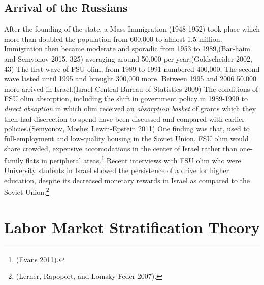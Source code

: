 \documentclass[12pt,twoside]{reedthesis}
\begin{document}
  \section{Arrival of the Russians}\label{sec:orgheadline2}
  
  After the founding of the state, a Mass Immigration (1948-1952) took
  place which more than doubled the population from 600,000 to almost 1.5
  million. Immigration then became moderate and sporadic from 1953 to
  1989,(Bar-haim and Semyonov 2015, 325) averaging around 50,000 per
  year.(Goldscheider 2002, 43) The first wave of FSU olim, from 1989 to
  1991 numbered 400,000. The second wave lasted until 1995 and brought
  300,000 more. Between 1995 and 2006 50,000 more arrived in
  Israel.(Israel Central Bureau of Statistics 2009) The conditions of FSU
  olim absorption, including the shift in government policy in 1989-1990
  to \emph{direct absoption} in which olim received an \emph{absorption
  basket} of grants which they then had discrection to spend have been
  discussed and compared with earlier policies.(Semyonov, Moshe;
  Lewin-Epstein 2011) One finding was that, used to full-employment and
  low-quality housing in the Soviet Union, FSU olim would share crowded,
  expensive accomodations in the center of Israel rather than one-family
  flats in peripheral areas.\footnote{(Evans 2011).} Recent interviews
  with FSU olim who were University students in Israel showed the
  persistence of a drive for higher education, despite its decreased
  monetary rewards in Israel as compared to the Soviet Union.\footnote{(Lerner,
    Rapoport, and Lomsky-Feder 2007).}
  
  \chapter{Labor Market Stratification Theory}\label{sec:orgheadline4}
  
\end{document}
